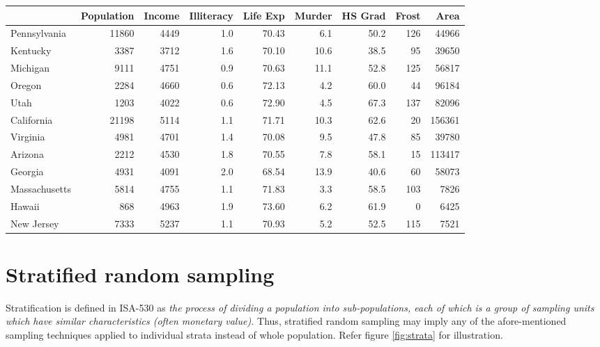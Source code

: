 \documentclass[
]{book}
\begin{document}
\begin{tabular}{l|r|r|r|r|r|r|r|r}
\hline
  & Population & Income & Illiteracy & Life Exp & Murder & HS Grad & Frost & Area\\
\hline
Pennsylvania & 11860 & 4449 & 1.0 & 70.43 & 6.1 & 50.2 & 126 & 44966\\
\hline
Kentucky & 3387 & 3712 & 1.6 & 70.10 & 10.6 & 38.5 & 95 & 39650\\
\hline
Michigan & 9111 & 4751 & 0.9 & 70.63 & 11.1 & 52.8 & 125 & 56817\\
\hline
Oregon & 2284 & 4660 & 0.6 & 72.13 & 4.2 & 60.0 & 44 & 96184\\
\hline
Utah & 1203 & 4022 & 0.6 & 72.90 & 4.5 & 67.3 & 137 & 82096\\
\hline
California & 21198 & 5114 & 1.1 & 71.71 & 10.3 & 62.6 & 20 & 156361\\
\hline
Virginia & 4981 & 4701 & 1.4 & 70.08 & 9.5 & 47.8 & 85 & 39780\\
\hline
Arizona & 2212 & 4530 & 1.8 & 70.55 & 7.8 & 58.1 & 15 & 113417\\
\hline
Georgia & 4931 & 4091 & 2.0 & 68.54 & 13.9 & 40.6 & 60 & 58073\\
\hline
Massachusetts & 5814 & 4755 & 1.1 & 71.83 & 3.3 & 58.5 & 103 & 7826\\
\hline
Hawaii & 868 & 4963 & 1.9 & 73.60 & 6.2 & 61.9 & 0 & 6425\\
\hline
New Jersey & 7333 & 5237 & 1.1 & 70.93 & 5.2 & 52.5 & 115 & 7521\\
\hline
\end{tabular}

\hypertarget{stratified-random-sampling}{%
\section{Stratified random sampling}\label{stratified-random-sampling}}

Stratification is defined in ISA-530 as \emph{the process of dividing a population into sub-populations, each of which is a group of sampling units which have similar characteristics (often monetary value).} Thus, stratified random sampling may imply any of the afore-mentioned sampling techniques applied to individual strata instead of whole population. Refer figure \ref{fig:strata} for illustration.
\end{document}
